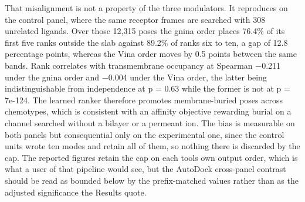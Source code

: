 That misalignment is not a property of the three modulators. It reproduces on the control panel, where the same receptor frames are searched with 308 unrelated ligands. Over those 12,315 poses the gnina order places 76.4\% of its first five ranks outside the slab against 89.2\% of ranks six to ten, a gap of 12.8 percentage points, whereas the Vina order moves by 0.5 points between the same bands. Rank correlates with transmembrane occupancy at Spearman \ensuremath{-}0.211 under the gnina order and \ensuremath{-}0.004 under the Vina order, the latter being indistinguishable from independence at p = 0.63 while the former is not at p = 7e-124. The learned ranker therefore promotes membrane-buried poses across chemotypes, which is consistent with an affinity objective rewarding burial on a channel searched without a bilayer or a permeant ion. The bias is measurable on both panels but consequential only on the experimental one, since the control units wrote ten modes and retain all of them, so nothing there is discarded by the cap. The reported figures retain the cap on each tool\textquotesingle s own output order, which is what a user of that pipeline would see, but the AutoDock cross-panel contrast should be read as bounded below by the prefix-matched values rather than as the adjusted significance the Results quote.

